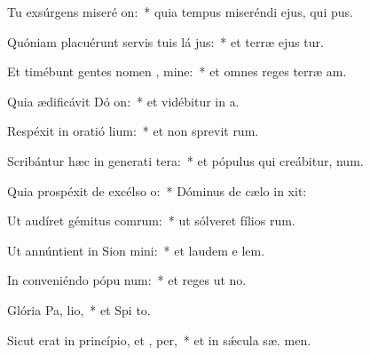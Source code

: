 \item Tu exsúrgens miseré on:~* quia tempus miseréndi ejus, qui  pus.
\item Quóniam placuérunt servis tuis lá jus:~* et terræ ejus tur.
\item Et timébunt gentes nomen , mine:~* et omnes reges terræ  am.
\item Quia ædificávit Dó on:~* et vidébitur in  a.
\item Respéxit in oratió lium:~* et non sprevit  rum.
\item Scribántur hæc in generati tera:~* et pópulus qui creábitur,  num.
\item Quia prospéxit de excélso  o:~* Dóminus de cælo in  xit:
\item Ut audíret gémitus comrum:~* ut sólveret fílios rum.
\item Ut annúntient in Sion  mini:~* et laudem e  lem.
\item In conveniéndo pópu  num:~* et reges ut  no.
\item Glória Pa,  lio,~* et Spi to.
\item Sicut erat in princípio, et ,  per,~* et in sǽcula sæ. men.
